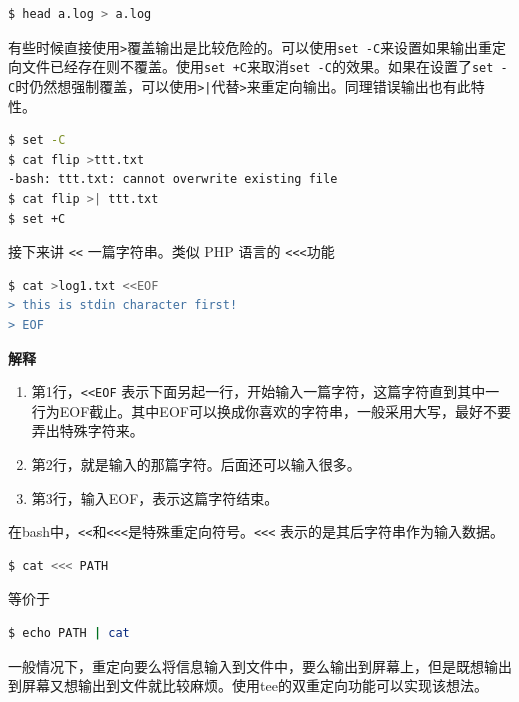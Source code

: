 \documentclass[doctor,openright,twoside]{sjtuthesis}
\providecommand{\tightlist}{%
    \setlength{\itemsep}{0pt}\setlength{\parskip}{0pt}}
\newcommand{\passthrough}[1]{#1}
\theoremstyle{plain}
\theoremstyle{definition}
\theoremstyle{remark}
\theoremstyle{ocrenumbox}
\theoremstyle{plain}
\begin{document}
\begin{lstlisting}[language=bash]
$ head a.log > a.log
\end{lstlisting}

有些时候直接使用\passthrough{\lstinline!>!}覆盖输出是比较危险的。可以使用\passthrough{\lstinline!set -C!}来设置如果输出重定向文件已经存在则不覆盖。使用\passthrough{\lstinline!set +C!}来取消\passthrough{\lstinline!set -C!}的效果。如果在设置了\passthrough{\lstinline!set -C!}时仍然想强制覆盖，可以使用\passthrough{\lstinline!>|!}代替\passthrough{\lstinline!>!}来重定向输出。同理错误输出也有此特性。

\begin{lstlisting}[language=bash]
$ set -C
$ cat flip >ttt.txt
-bash: ttt.txt: cannot overwrite existing file
$ cat flip >| ttt.txt
$ set +C
\end{lstlisting}

接下来讲 \passthrough{\lstinline!<<!} 一篇字符串。类似 PHP 语言的
\passthrough{\lstinline!<<<!}功能

\begin{lstlisting}[language=bash]
$ cat >log1.txt <<EOF 
> this is stdin character first!
> EOF
\end{lstlisting}

\textbf{解释}

\begin{enumerate}
\def\labelenumi{\arabic{enumi}.}
\tightlist
\item
  第1行，\passthrough{\lstinline!<<EOF!}
  表示下面另起一行，开始输入一篇字符，这篇字符直到其中一行为EOF截止。其中EOF可以换成你喜欢的字符串，一般采用大写，最好不要弄出特殊字符来。
\item
  第2行，就是输入的那篇字符。后面还可以输入很多。
\item
  第3行，输入EOF，表示这篇字符结束。
\end{enumerate}

在bash中，\passthrough{\lstinline!<<!}和\passthrough{\lstinline!<<<!}是特殊重定向符号。\passthrough{\lstinline!<<<!}
表示的是其后字符串作为输入数据。

\begin{lstlisting}[language=bash]
$ cat <<< PATH
\end{lstlisting}

等价于

\begin{lstlisting}[language=bash]
$ echo PATH | cat
\end{lstlisting}

一般情况下，重定向要么将信息输入到文件中，要么输出到屏幕上，但是既想输出到屏幕又想输出到文件就比较麻烦。使用tee的双重定向功能可以实现该想法。
\end{document}
